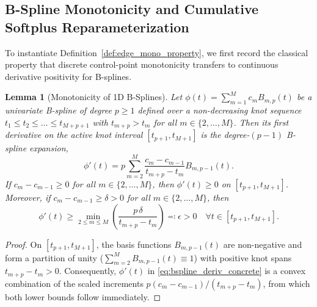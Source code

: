 \documentclass[11pt,a4paper]{article}
\theoremstyle{plain}
\newtheorem{lemma}[theorem]{Lemma}
\theoremstyle{definition}
\theoremstyle{remark}
\begin{document}
\subsection{B-Spline Monotonicity and Cumulative Softplus Reparameterization}
\label{subsec:softplus_reparam}

To instantiate Definition~\ref{def:edge_mono_property}, we first record the classical property that discrete control-point monotonicity transfers to continuous derivative positivity for B-splines.

\begin{lemma}[Monotonicity of 1D B-Splines]
\label{lem:bspline_concrete}
Let $\phi(t) = \sum_{m=1}^M c_m B_{m, p}(t)$ be a univariate B-spline of degree $p \ge 1$ defined over a non-decreasing knot sequence $t_1 \le t_2 \le \dots \le t_{M+p+1}$ with $t_{m+p} > t_m$ for all $m \in \{2, \dots, M\}$. Then its first derivative on the active knot interval $[t_{p+1}, t_{M+1}]$ is the degree-$(p-1)$ B-spline expansion,
\begin{equation}
    \phi'(t) = p \sum_{m=2}^M \frac{c_m - c_{m-1}}{t_{m+p} - t_m} B_{m, p-1}(t).
    \label{eq:bspline_deriv_concrete}
\end{equation}
If $c_m - c_{m-1} \ge 0$ for all $m \in \{2, \dots, M\}$, then $\phi'(t) \ge 0$ on $[t_{p+1}, t_{M+1}]$. Moreover, if $c_m - c_{m-1} \ge \delta > 0$ for all $m \in \{2, \dots, M\}$, then
\begin{equation}
    \phi'(t) \ge \min_{2 \le m \le M} \left( \frac{p\,\delta}{t_{m+p} - t_m} \right) \eqqcolon \epsilon > 0 \quad \forall t \in [t_{p+1}, t_{M+1}].
\end{equation}
\end{lemma}

\begin{proof}
On $[t_{p+1}, t_{M+1}]$, the basis functions $B_{m, p-1}(t)$ are non-negative and form a partition of unity ($\sum_{m=2}^M B_{m, p-1}(t) \equiv 1$) with positive knot spans $t_{m+p} - t_m > 0$. Consequently, $\phi'(t)$ in \eqref{eq:bspline_deriv_concrete} is a convex combination of the scaled increments $p(c_m - c_{m-1})/(t_{m+p} - t_m)$, from which both lower bounds follow immediately.
\end{proof}
\end{document}
